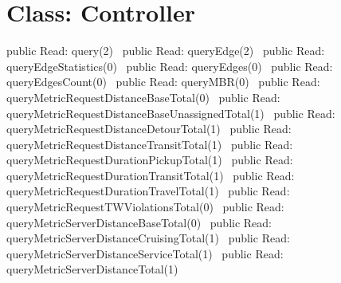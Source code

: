 \section*{Class: Controller}
\nwenddocs{}\endmoddef{}
public \LA{}Read: query(2)~{\nwtagstyle{}}\RA{}
public \LA{}Read: queryEdge(2)~{\nwtagstyle{}}\RA{}
public \LA{}Read: queryEdgeStatistics(0)~{\nwtagstyle{}}\RA{}
public \LA{}Read: queryEdges(0)~{\nwtagstyle{}}\RA{}
public \LA{}Read: queryEdgesCount(0)~{\nwtagstyle{}}\RA{}
public \LA{}Read: queryMBR(0)~{\nwtagstyle{}}\RA{}
public \LA{}Read: queryMetricRequestDistanceBaseTotal(0)~{\nwtagstyle{}}\RA{}
public \LA{}Read: queryMetricRequestDistanceBaseUnassignedTotal(1)~{\nwtagstyle{}}\RA{}
public \LA{}Read: queryMetricRequestDistanceDetourTotal(1)~{\nwtagstyle{}}\RA{}
public \LA{}Read: queryMetricRequestDistanceTransitTotal(1)~{\nwtagstyle{}}\RA{}
public \LA{}Read: queryMetricRequestDurationPickupTotal(1)~{\nwtagstyle{}}\RA{}
public \LA{}Read: queryMetricRequestDurationTransitTotal(1)~{\nwtagstyle{}}\RA{}
public \LA{}Read: queryMetricRequestDurationTravelTotal(1)~{\nwtagstyle{}}\RA{}
public \LA{}Read: queryMetricRequestTWViolationsTotal(0)~{\nwtagstyle{}}\RA{}
public \LA{}Read: queryMetricServerDistanceBaseTotal(0)~{\nwtagstyle{}}\RA{}
public \LA{}Read: queryMetricServerDistanceCruisingTotal(1)~{\nwtagstyle{}}\RA{}
public \LA{}Read: queryMetricServerDistanceServiceTotal(1)~{\nwtagstyle{}}\RA{}
public \LA{}Read: queryMetricServerDistanceTotal(1)~{\nwtagstyle{}}\RA{}
